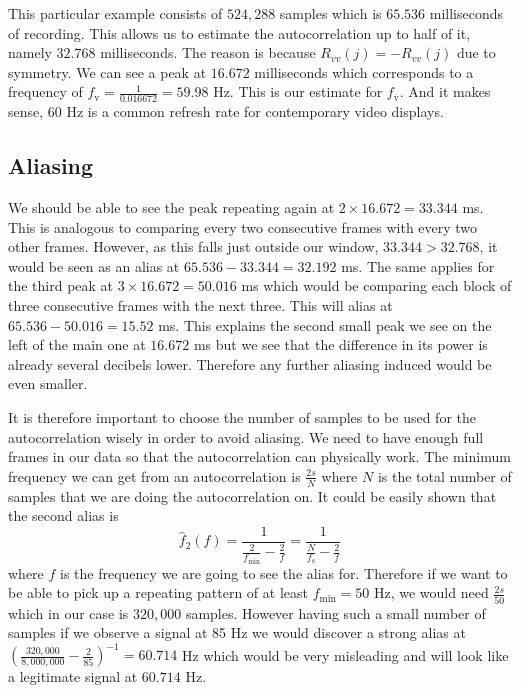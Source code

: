 \documentclass[a4paper,12pt,twoside,openright]{report}
\begin{document}
This particular example consists of $524,288$ samples which is $65.536$ milliseconds of recording. This allows us to estimate the autocorrelation up to half of it, namely $32.768$ milliseconds. The reason is because $R_{vv}(j)=-R_{vv}(j)$ due to symmetry. We can see a peak at $16.672$ milliseconds which corresponds to a frequency of $f_\text{v} = \frac{1}{0.016672} = 59.98$ Hz. This is our estimate for $f_\text{v}$. And it makes sense, $60$ Hz is a common refresh rate for contemporary video displays.

\subsection{Aliasing}
We should be able to see the peak repeating again at $2 \times 16.672 = 33.344$ ms. This is analogous to comparing every two consecutive frames with every two other frames. However, as this falls just outside our window, $33.344 > 32.768$, it would be seen as an alias at $65.536-33.344 = 32.192$ ms. The same applies for the third peak at $3 \times 16.672 = 50.016$ ms which would be comparing each block of three consecutive frames with the next three. This will alias at $65.536 - 50.016 = 15.52$ ms. This explains the second small peak we see on the left of the main one at $16.672$ ms but we see that the difference in its power is already several decibels lower. Therefore any further aliasing induced would be even smaller.

It is therefore important to choose the number of samples to be used for the autocorrelation wisely in order to avoid aliasing. We need to have enough full frames in our data so that the autocorrelation can physically work. The minimum frequency we can get from an autocorrelation is $\frac{2 s}{N}$ where $N$ is the total number of samples that we are doing the autocorrelation on. It could be easily shown that the second alias is
\begin{equation}
\hat{f}_{2}(f) = \frac{1}{\frac{2}{f_\text{min}}-\frac{2}{f}} = \frac{1}{\frac{N}{f_\text{s}}-\frac{2}{f}}
\end{equation}
where $f$ is the frequency we are going to see the alias for. Therefore if we want to be able to pick up a repeating pattern of at least $f_\text{min} = 50$ Hz, we would need $\frac{2 s}{50}$ which in our case is $320,000$ samples. However having such a small number of samples if we observe a signal at 85 Hz we would discover a strong alias at $\left( \frac{320,000}{8,000,000}-\frac{2}{85} \right)^{-1} = 60.714$ Hz which would be very misleading and will look like a legitimate signal at $60.714$ Hz. 
\end{document}
